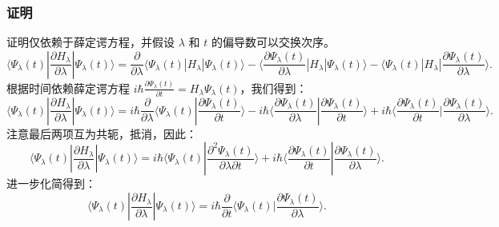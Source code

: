 \subsubsection{证明}
证明仅依赖于薛定谔方程，并假设 \(\lambda\) 和 \(t\) 的偏导数可以交换次序。
\[
\langle \Psi_{\lambda}(t) | \frac{\partial H_{\lambda}}{\partial \lambda} | \Psi_{\lambda}(t) \rangle = \frac{\partial}{\partial \lambda} \langle \Psi_{\lambda}(t) | H_{\lambda} | \Psi_{\lambda}(t) \rangle 
- \langle \frac{\partial \Psi_{\lambda}(t)}{\partial \lambda} | H_{\lambda} | \Psi_{\lambda}(t) \rangle 
- \langle \Psi_{\lambda}(t) | H_{\lambda} | \frac{\partial \Psi_{\lambda}(t)}{\partial \lambda} \rangle.~
\]
根据时间依赖薛定谔方程 \(i\hbar \frac{\partial \Psi_{\lambda}(t)}{\partial t} = H_{\lambda} \Psi_{\lambda}(t)\)，我们得到：
\[
\langle \Psi_{\lambda}(t) | \frac{\partial H_{\lambda}}{\partial \lambda} | \Psi_{\lambda}(t) \rangle = i\hbar \frac{\partial}{\partial \lambda} \langle \Psi_{\lambda}(t) | \frac{\partial \Psi_{\lambda}(t)}{\partial t} \rangle 
- i\hbar \langle \frac{\partial \Psi_{\lambda}(t)}{\partial \lambda} | \frac{\partial \Psi_{\lambda}(t)}{\partial t} \rangle 
+ i\hbar \langle \frac{\partial \Psi_{\lambda}(t)}{\partial t} | \frac{\partial \Psi_{\lambda}(t)}{\partial \lambda} \rangle.~
\]
注意最后两项互为共轭，抵消，因此：
\[
\langle \Psi_{\lambda}(t) | \frac{\partial H_{\lambda}}{\partial \lambda} | \Psi_{\lambda}(t) \rangle = i\hbar \langle \Psi_{\lambda}(t) | \frac{\partial^2 \Psi_{\lambda}(t)}{\partial \lambda \partial t} \rangle + i\hbar \langle \frac{\partial \Psi_{\lambda}(t)}{\partial t} | \frac{\partial \Psi_{\lambda}(t)}{\partial \lambda} \rangle.~
\]
进一步化简得到：
\[
\langle \Psi_{\lambda}(t) | \frac{\partial H_{\lambda}}{\partial \lambda} | \Psi_{\lambda}(t) \rangle = i\hbar \frac{\partial}{\partial t} \langle \Psi_{\lambda}(t) | \frac{\partial \Psi_{\lambda}(t)}{\partial \lambda} \rangle.~
\]
